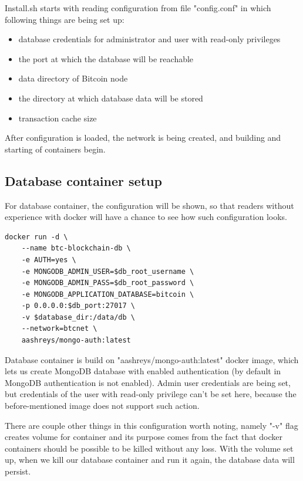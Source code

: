 \documentclass[12pt, en, eng, twoside, final]{mgr}
\begin{document}
Install.sh starts with reading configuration from file "config.conf" in which following things are being set up:

\begin{itemize}
\item
database credentials for administrator and user with read-only privileges
\item
the port at which the database will be reachable
\item
data directory of Bitcoin node
\item
the directory at which database data will be stored
\item
transaction cache size
\end{itemize} 

After configuration is loaded, the network is being created, and building and starting of containers begin.

\subsection{Database container setup}
For database container, the configuration will be shown, so that readers without experience with docker will have a chance to see how such configuration looks.

\begin{lstlisting}[caption=Database container run command]
docker run -d \
    --name btc-blockchain-db \
    -e AUTH=yes \
    -e MONGODB_ADMIN_USER=$db_root_username \
    -e MONGODB_ADMIN_PASS=$db_root_password \
    -e MONGODB_APPLICATION_DATABASE=bitcoin \
    -p 0.0.0.0:$db_port:27017 \
    -v $database_dir:/data/db \
    --network=btcnet \
    aashreys/mongo-auth:latest
\end{lstlisting}

Database container is build on "aashreys/mongo-auth:latest" \cite{mongo-auth} docker image, which lets us create MongoDB database with enabled authentication (by default in MongoDB authentication is not enabled).
Admin user credentials are being set, but credentials of the user with read-only privilege can't be set here, because the before-mentioned image does not support such action.

There are couple other things in this configuration worth noting, namely "-v" flag creates volume for container and its purpose comes from the fact that docker containers should be possible to be killed without any loss. With the volume set up, when we kill our database container and run it again, the database data will persist.
\end{document}
